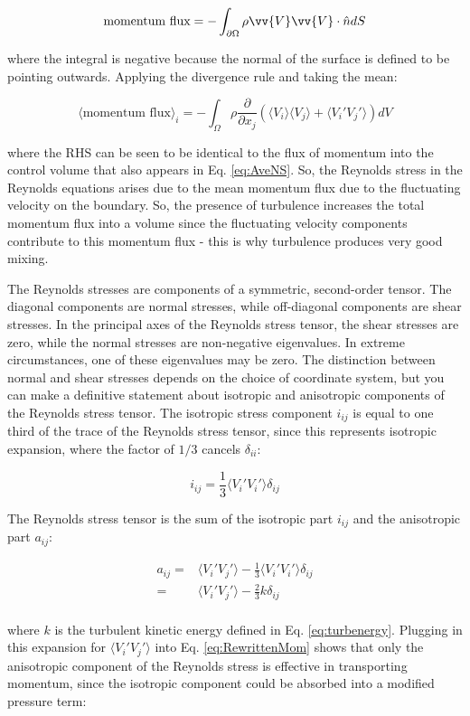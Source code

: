 \documentclass[10pt]{article}
\newcommand{\beq}{\begin{equation}}
\newcommand{\eeq}{\end{equation}}
\newcommand{\beqa}{\begin{equation}\begin{aligned}}
\newcommand{\eeqa}{\end{aligned}\end{equation}}
\newcommand{\la}{\langle}
\newcommand{\ra}{\rangle}
\begin{document}
\begin{flushleft}
\beq
\textrm{momentum flux}=-\int_{\partial\Omega}\rho\vv{V}\vv{V}\cdot\hat{n}dS
\eeq

where the integral is negative because the normal of the surface is defined to be pointing outwards. Applying the divergence rule and taking the mean:

\beq
\la\textrm{momentum flux}\ra_i=-\int_{\Omega}\rho\frac{\partial}{\partial x_j}\left(\la V_i\ra\la V_j\ra+\la V_i'V_j'\ra\right)dV
\eeq

where the RHS can be seen to be identical to the flux of momentum into the control volume that also appears in Eq. \eqref{eq:AveNS}. So, the Reynolds stress in the Reynolds equations arises due to the mean momentum flux due to the fluctuating velocity on the boundary. So, the presence of turbulence increases the total momentum flux into a volume since the fluctuating velocity components contribute to this momentum flux - this is why turbulence produces very good mixing. 

The Reynolds stresses are components of a symmetric, second-order tensor. The diagonal components are normal stresses, while off-diagonal components are shear stresses. In the principal axes of the Reynolds stress tensor, the shear stresses are zero, while the normal stresses are non-negative eigenvalues. In extreme circumstances, one of these eigenvalues may be zero. The distinction between normal and shear stresses depends on the choice of coordinate system, but you can make a definitive statement about isotropic and anisotropic components of the Reynolds stress tensor. The isotropic stress component \(i_{ij}\) is equal to one third of the trace of the Reynolds stress tensor, since this represents isotropic expansion, where the factor of \(1/3\) cancels \(\delta_{ii}\): 

\beq
i_{ij} = \frac{1}{3}\la V_i'V_i'\ra\delta_{ij}
\eeq

The Reynolds stress tensor is the sum of the isotropic part \(i_{ij}\) and the anisotropic part \(a_{ij}\):

\beqa
a_{ij}=&\la V_i'V_j'\ra-\frac{1}{3}\la V_i'V_i'\ra\delta_{ij}\\
=& \la V_i'V_j'\ra-\frac{2}{3}k\delta_{ij}\\
\eeqa

where \(k\) is the turbulent kinetic energy defined in Eq. \eqref{eq:turbenergy}. Plugging in this expansion for \(\la V_i'V_j'\ra\) into Eq. \eqref{eq:RewrittenMom} shows that only the anisotropic component of the Reynolds stress is effective in transporting momentum, since the isotropic component could be absorbed into a modified pressure term:


\end{flushleft}
\end{document}
